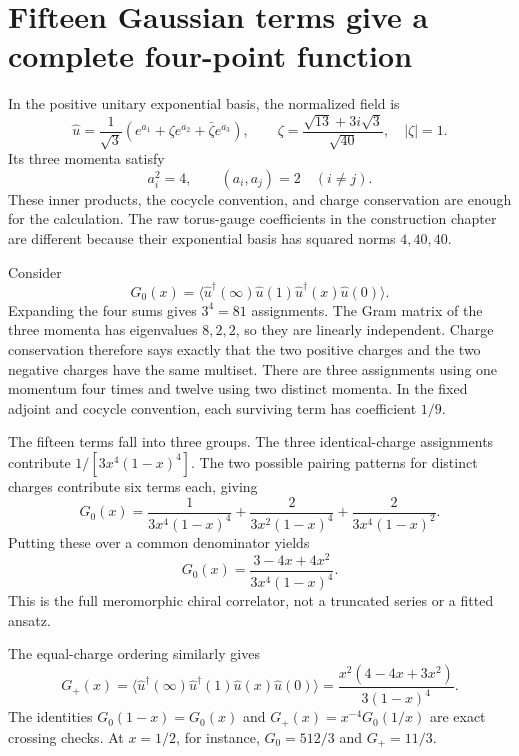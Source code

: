 \section{Fifteen Gaussian terms give a complete four-point function}

In the positive unitary exponential basis, the normalized field is
\begin{equation}
 \widehat u=\frac1{\sqrt3}
   \left(e^{a_1}+\zeta e^{a_2}+\bar\zeta e^{a_3}\right),
 \qquad
 \zeta=\frac{\sqrt{13}+3i\sqrt3}{\sqrt{40}},
 \quad |\zeta|=1.
 \label{eq:corr-u-unitary}
\end{equation}
Its three momenta satisfy
\[
 a_i^2=4,\qquad(a_i,a_j)=2\quad(i\ne j).
\]
These inner products, the cocycle convention, and charge
conservation are enough for the calculation. The raw torus-gauge
coefficients in the construction chapter are different because
their exponential basis has squared norms $4,40,40$.

Consider
\[
 G_0(x)=\langle\widehat u^\dagger(\infty)\widehat u(1)
                   \widehat u^\dagger(x)\widehat u(0)\rangle.
\]
Expanding the four sums gives $3^4=81$ assignments. The Gram matrix
of the three momenta has eigenvalues $8,2,2$, so they are linearly
independent. Charge conservation therefore says exactly that
the two positive charges and the two negative charges have the
same multiset. There are three assignments using
one momentum four times and twelve using two distinct momenta.
In the fixed adjoint and cocycle convention, each surviving term
has coefficient $1/9$.

The fifteen terms fall into three groups. The three identical-charge
assignments contribute
$1/[3x^4(1-x)^4]$. The two possible pairing patterns for distinct
charges contribute six terms each, giving
\[
 G_0(x)=\frac1{3x^4(1-x)^4}
       +\frac2{3x^2(1-x)^4}
       +\frac2{3x^4(1-x)^2}.
\]
Putting these over a common denominator yields
\begin{equation}
 G_0(x)=\frac{3-4x+4x^2}{3x^4(1-x)^4}.
 \label{eq:corr-u-neutral}
\end{equation}
This is the full meromorphic chiral correlator, not a truncated
series or a fitted ansatz.

The equal-charge ordering similarly gives
\begin{equation}
 G_+(x)=\langle\widehat u^\dagger(\infty)
    \widehat u^\dagger(1)\widehat u(x)\widehat u(0)\rangle
 =\frac{x^2(4-4x+3x^2)}{3(1-x)^4}.
 \label{eq:corr-u-charged}
\end{equation}
The identities $G_0(1-x)=G_0(x)$ and
$G_+(x)=x^{-4}G_0(1/x)$ are exact crossing checks.
At $x=1/2$, for instance,
$G_0=512/3$ and $G_+=11/3$.

